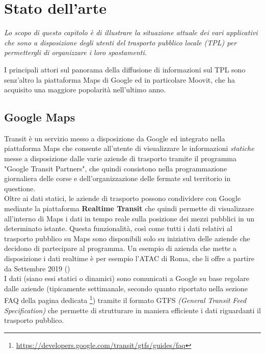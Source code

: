 \chapter{Stato dell'arte} %
%

\begin{citazione}
    \textit{Lo scopo di questo capitolo è di illustrare la situazione attuale dei vari applicativi che sono a disposizione degli utenti del trasporto pubblico locale (TPL) per permettergli di organizzare i loro spostamenti.}
\end{citazione}

\newpage

I principali attori sul panorama della diffusione di informazioni sul TPL sono senz'altro la piattaforma Maps di Google ed in particolare Moovit, che ha acquisito una maggiore popolarità nell'ultimo anno.

\section{Google Maps}
    Transit è un servizio messo a disposizione da Google ed integrato nella piattaforma Maps che consente all'utente di visualizzare le informazioni \textit{statiche} messe a disposizione dalle varie aziende di trasporto tramite il programma "Google Transit Partners", che quindi consistono nella programmazione giornaliera delle corse e dell'organizzazione delle fermate sul territorio in questione. \\
    Oltre ai dati statici, le aziende di trasporto possono condividere con Google mediante la piattaforma \textbf{Realtime Transit} che quindi permette di visualizzare all'interno di Maps i dati in tempo reale sulla posizione dei mezzi pubblici in un determinato istante. Questa funzionalità, così come tutti i dati relativi al trasporto pubblico su Maps sono disponibili solo su iniziativa delle aziende che decidono di partecipare al programma. Un esempio di azienda che mette a disposizione i dati realtime è per esempio l'ATAC di Roma, che li offre a partire da Settembre 2019 (\cite{atactransit})  \\
    I dati (siano essi statici o dinamici) sono comunicati a Google su base regolare dalle aziende (tipicamente settimanale, secondo quanto riportato nella sezione FAQ della pagina dedicata \footnote[3]{\url{https://developers.google.com/transit/gtfs/guides/faq}}) tramite il formato GTFS \textit{(General Transit Feed Specification)} che permette di strutturare in maniera efficiente i dati riguardanti il trasporto pubblico.

